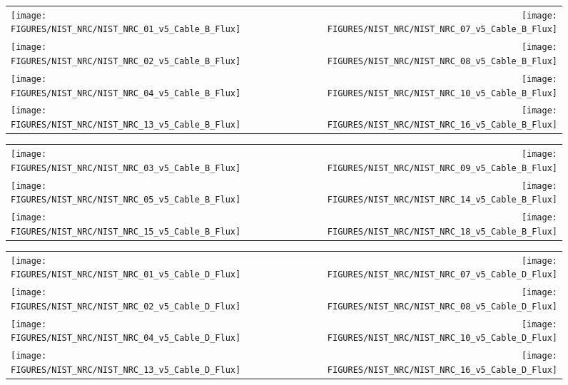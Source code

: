 \begin{figure}[h!]
\begin{tabular*}{\textwidth}{l@{\extracolsep{\fill}}r}
\texttt{[image: FIGURES/NIST\_NRC/NIST\_NRC\_01\_v5\_Cable\_B\_Flux]} &
\texttt{[image: FIGURES/NIST\_NRC/NIST\_NRC\_07\_v5\_Cable\_B\_Flux]} \\
\texttt{[image: FIGURES/NIST\_NRC/NIST\_NRC\_02\_v5\_Cable\_B\_Flux]} &
\texttt{[image: FIGURES/NIST\_NRC/NIST\_NRC\_08\_v5\_Cable\_B\_Flux]} \\
\texttt{[image: FIGURES/NIST\_NRC/NIST\_NRC\_04\_v5\_Cable\_B\_Flux]} &
\texttt{[image: FIGURES/NIST\_NRC/NIST\_NRC\_10\_v5\_Cable\_B\_Flux]} \\
\texttt{[image: FIGURES/NIST\_NRC/NIST\_NRC\_13\_v5\_Cable\_B\_Flux]} &
\texttt{[image: FIGURES/NIST\_NRC/NIST\_NRC\_16\_v5\_Cable\_B\_Flux]}
\end{tabular*}
\label{NIST_NRC_Cable_B_Flux_Closed}
\end{figure}

\begin{figure}[h!]
\begin{tabular*}{\textwidth}{l@{\extracolsep{\fill}}r}
\texttt{[image: FIGURES/NIST\_NRC/NIST\_NRC\_03\_v5\_Cable\_B\_Flux]} &
\texttt{[image: FIGURES/NIST\_NRC/NIST\_NRC\_09\_v5\_Cable\_B\_Flux]} \\
\texttt{[image: FIGURES/NIST\_NRC/NIST\_NRC\_05\_v5\_Cable\_B\_Flux]} &
\texttt{[image: FIGURES/NIST\_NRC/NIST\_NRC\_14\_v5\_Cable\_B\_Flux]} \\
\texttt{[image: FIGURES/NIST\_NRC/NIST\_NRC\_15\_v5\_Cable\_B\_Flux]} &
\texttt{[image: FIGURES/NIST\_NRC/NIST\_NRC\_18\_v5\_Cable\_B\_Flux]}
\end{tabular*}
\label{NIST_NRC_Cable_B_Flux_Open}
\end{figure}


\begin{figure}[h!]
\begin{tabular*}{\textwidth}{l@{\extracolsep{\fill}}r}
\texttt{[image: FIGURES/NIST\_NRC/NIST\_NRC\_01\_v5\_Cable\_D\_Flux]} &
\texttt{[image: FIGURES/NIST\_NRC/NIST\_NRC\_07\_v5\_Cable\_D\_Flux]} \\
\texttt{[image: FIGURES/NIST\_NRC/NIST\_NRC\_02\_v5\_Cable\_D\_Flux]} &
\texttt{[image: FIGURES/NIST\_NRC/NIST\_NRC\_08\_v5\_Cable\_D\_Flux]} \\
\texttt{[image: FIGURES/NIST\_NRC/NIST\_NRC\_04\_v5\_Cable\_D\_Flux]} &
\texttt{[image: FIGURES/NIST\_NRC/NIST\_NRC\_10\_v5\_Cable\_D\_Flux]} \\
\texttt{[image: FIGURES/NIST\_NRC/NIST\_NRC\_13\_v5\_Cable\_D\_Flux]} &
\texttt{[image: FIGURES/NIST\_NRC/NIST\_NRC\_16\_v5\_Cable\_D\_Flux]}
\end{tabular*}
\label{NIST_NRC_Cable_D_Flux_Closed}
\end{figure}

